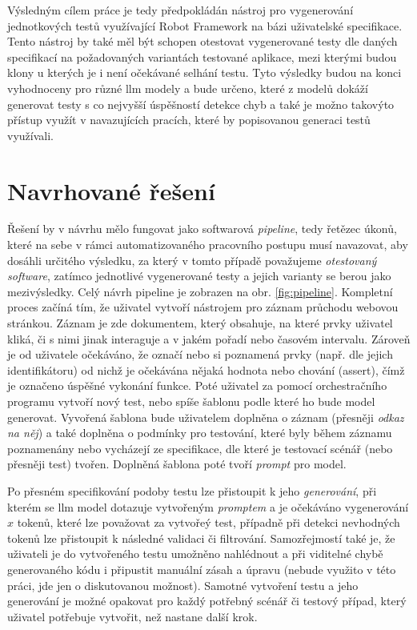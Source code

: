 \documentclass[czech, ma, kiv, he, iso690numb, pdf, viewonly]{fasthesis}
\begin{document}
        Výsledným cílem práce je tedy předpokládán nástroj pro vygenerování jednotkových testů využívající Robot Framework na bázi uživatelské specifikace. Tento nástroj by také měl být schopen otestovat vygenerované testy dle daných specifikací na požadovaných variantách testované aplikace, mezi kterými budou klony u kterých je i není očekávané selhání testu. Tyto výsledky budou na konci vyhodnoceny pro různé \Gls{llm} modely a bude určeno, které z modelů dokáží generovat testy s co nejvyšší úspěšností detekce chyb a také je možno takovýto přístup využít v navazujících pracích, které by popisovanou generaci testů využívali.

        \section{Navrhované řešení} \label{sec:proposal}

        Řešení by v návrhu mělo fungovat jako softwarová \emph{pipeline}, tedy řetězec úkonů, které na sebe v rámci automatizovaného pracovního postupu musí navazovat, aby dosáhli určitého výsledku, za který v tomto případě považujeme \textit{otestovaný software}, zatímco jednotlivé vygenerované testy a jejich varianty se berou jako mezivýsledky. Celý návrh pipeline je zobrazen na obr. \ref{fig:pipeline}. Kompletní proces začíná tím, že uživatel vytvoří nástrojem pro záznam průchodu webovou stránkou. Záznam je zde dokumentem, který obsahuje, na které prvky uživatel kliká, či s nimi jinak interaguje a v jakém pořadí nebo časovém intervalu. Zároveň je od uživatele očekáváno, že označí nebo si poznamená prvky (např. dle jejich identifikátoru) od nichž je očekávána nějaká hodnota nebo chování (assert), čímž je označeno úspěšné vykonání funkce. Poté uživatel za pomocí orchestračního programu vytvoří nový test, nebo spíše šablonu podle které ho bude model generovat. Vyvořená šablona bude uživatelem doplněna o záznam (přesněji \textit{odkaz na něj}) a také doplněna o podmínky pro testování, které byly během záznamu poznamenány nebo vycházejí ze specifikace, dle které je testovací scénář (nebo přesněji test) tvořen. Doplněná šablona poté tvoří \emph{prompt} pro model.

        Po přesném specifikování podoby testu lze přistoupit k jeho \emph{generování}, při kterém se \Gls{llm} model dotazuje vytvořeným \emph{promptem} a je očekáváno vygenerování \(x\) tokenů, které lze považovat za vytvořeý test, případně při detekci nevhodných tokenů lze přistoupit k následné validaci či filtrování. Samozřejmostí také je, že uživateli je do vytvořeného testu umožněno nahlédnout a při viditelné chybě generovaného kódu i připustit manuální zásah a úpravu (nebude využito v této práci, jde jen o diskutovanou možnost). Samotné vytvoření testu a jeho generování je možné opakovat pro každý potřebný scénář či testový případ, který uživatel potřebuje vytvořit, než nastane další krok.
\end{document}
